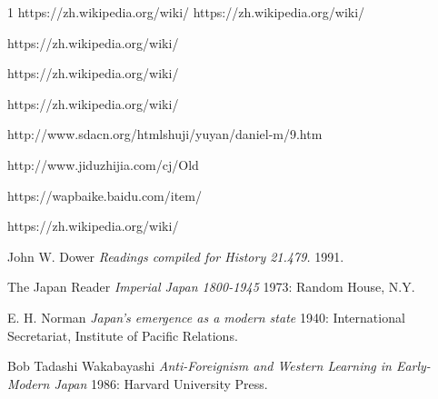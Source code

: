 \begin{thebibliography}{1}
   https://zh.wikipedia.org/wiki/%
   https://zh.wikipedia.org/wiki/%

   https://zh.wikipedia.org/wiki/%
  
    https://zh.wikipedia.org/wiki/%
  
     https://zh.wikipedia.org/wiki/%

    http://www.sdacn.org/htmlshuji/yuyan/daniel-m/9.htm

     http://www.jiduzhijia.com/cj/Old%
   
     https://wapbaike.baidu.com/item/%

     https://zh.wikipedia.org/wiki/%

   John W. Dower {\em Readings compiled for History
  21.479.}  1991.

    The Japan Reader {\em Imperial Japan 1800-1945} 1973:
  Random House, N.Y.

   E. H. Norman {\em Japan's emergence as a modern
  state} 1940: International Secretariat, Institute of Pacific
  Relations.

   Bob Tadashi Wakabayashi {\em Anti-Foreignism and Western
  Learning in Early-Modern Japan} 1986: Harvard University Press.


  \end{thebibliography}


